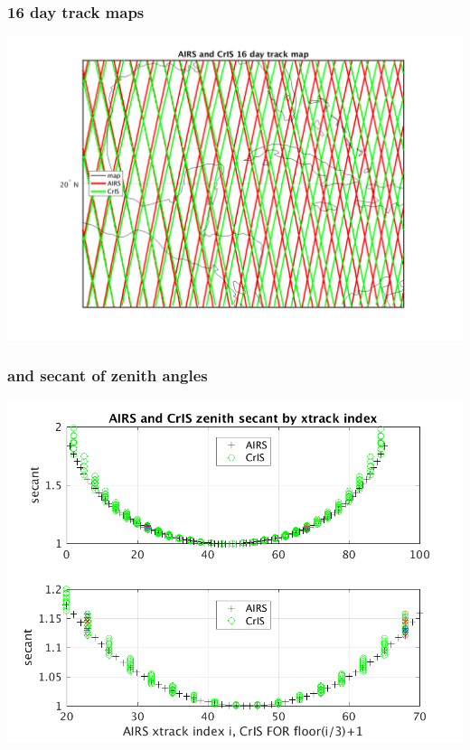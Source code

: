 \begin{frame}
\frametitle{16 day track maps}
\begin{center}
  \includegraphics[scale=0.5]{figures/subpt_16_day_zoom.png}
\end{center}
\end{frame} %
\begin{frame}
\frametitle{{\airs} and {\cris} secant of zenith angles}

\begin{center}
  \includegraphics[scale=0.7]{figures/AIRS_CrIS_secant_by_xtrack.png}
\end{center}
\end{frame} %
